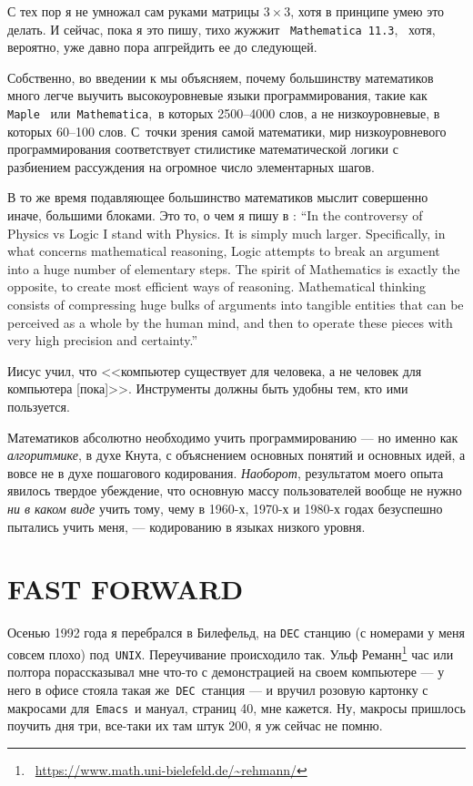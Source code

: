 \documentclass[intlimits,twoside,a4paper,11pt]{article}
\begin{document}
	С тех пор я не умножал сам руками матрицы $3\times 3$, хотя в
	принципе умею это делать. И сейчас, пока я это пишу, тихо жужжит \,
	{\tt Mathematica 11.3}, \, хотя, вероятно, уже давно пора апгрейдить ее
	до следующей.
	
	Собственно, во введении к \cite{VHY} мы объясняем, почему 
	большинству математиков много легче выучить высокоуровневые языки 
	программирования, такие как \, {\tt Maple} \, или \,{\tt Mathematica}, \,в которых 
	2500--4000 слов, а не низкоуровневые, в которых 60--100 слов.
	С~точки зрения самой математики, мир низкоуровневого программирования
	соответствует стилистике математической логики с разбиением рассуждения
	на огромное число элементарных шагов. 
	
	
	В то же время подавляющее большинство математиков мыслит совершенно 
	иначе, большими блоками. Это то, о чем я пишу в \cite{V19}:
	``In the controversy of Physics vs Logic I stand with
	Physics. It is simply much larger. Specifically, in what concerns mathematical reasoning, 
	Logic attempts to break an argument
	into a huge number of elementary steps. The spirit of Mathematics is exactly the 
	opposite, to create most efficient ways of
	reasoning. Mathematical thinking consists of compressing huge bulks of arguments 
	into tangible entities that can be perceived
	as a whole by the human mind, and then to operate these pieces with very high 
	precision and certainty.''
	
	Иисус учил, что <<компьютер существует для человека, а не человек для 
	компьютера [пока]>>. Инструменты должны быть удобны тем, кто ими пользуется. 
	
	Математиков абсолютно необходимо учить программированию --- но именно как
	{\it алгоритмике\/}, в духе Кнута, с объяснением основных понятий и основных 
	идей, а вовсе не в духе пошагового кодирования. {\it Наоборот\/},
	результатом моего опыта явилось твердое убеждение, что основную массу
	пользователей вообще не нужно {\it ни в каком виде\/} учить тому, чему 
	в 1960-х, 1970-х и 1980-х годах безуспешно пытались учить меня, --- кодированию 
	в языках низкого уровня.
	
	
	\section{FAST FORWARD}
	
	Осенью 1992 года я перебрался в Билефельд, на {\tt DEC} станцию (с номерами у 
	меня совсем плохо) под \,{\tt UNIX}. Переучивание происходило так. Ульф 
	Реманн\footnote{~\url{https://www.math.uni-bielefeld.de/\~rehmann/}} час или
	полтора порассказывал мне что-то с демонстрацией на своем компьютере ---  
	у него в офисе стояла такая же \,{\tt DEC}\, станция --- и вручил розовую картонку
	с макросами для \,{\tt Emacs}\, и мануал, страниц 40, мне кажется. Ну, макросы
	пришлось поучить дня три, все-таки их там штук 200, я уж сейчас не помню.
	
\end{document}

